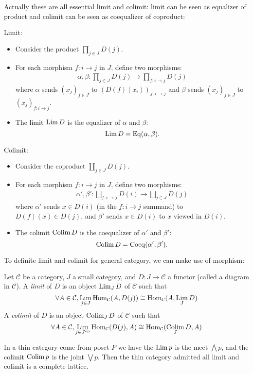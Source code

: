 \begin{remark}
  Actually these are all essential limit and colimit: limit can be seen as equalizer of product and colimit can be seen as coequalizer of coproduct:

  Limit:
\begin{itemize}
    \item Consider the product $\prod_{j \in J} D(j)$.
    \item For each morphism $f : i \to j$ in $J$, define two morphisms:
    \begin{align*}
        \alpha, \beta : \prod_{j \in J} D(j) \to \prod_{f : i \to j} D(j)
    \end{align*}
    where $\alpha$ sends $(x_j)_{j \in J}$ to $(D(f)(x_i))_{f : i \to j}$ and $\beta$ sends $(x_j)_{j \in J}$ to $(x_j)_{f : i \to j}$.
    \item The limit $\operatorname*{\mathrm{Lim}} D$ is the equalizer of $\alpha$ and $\beta$:
    \[
    \operatorname*{\mathrm{Lim}} D = \mathrm{Eq}(\alpha, \beta).
    \]
\end{itemize}
Colimit:
\begin{itemize}
    \item Consider the coproduct $\coprod_{j \in J} D(j)$.
    \item For each morphism $f : i \to j$ in $J$, define two morphisms:
    \begin{align*}
        \alpha', \beta' : \bigsqcup_{f : i \to j} D(i) \to \bigsqcup_{j \in J} D(j)
    \end{align*}
    where $\alpha'$ sends $x \in D(i)$ (in the $f : i \to j$ summand) to $D(f)(x) \in D(j)$, and $\beta'$ sends $x \in D(i)$ to $x$ viewed in $D(i)$.
    \item The colimit $\operatorname*{\mathrm{Colim}} D$ is the coequalizer of $\alpha'$ and $\beta'$:
    \[
    \operatorname*{\mathrm{Colim}} D = \mathrm{Coeq}(\alpha', \beta').
    \]
\end{itemize}
\end{remark}

\begin{remark}
  
\end{remark}

To definite limit and colimit for general category, we can make use of morphism:
\begin{definition}
  Let $\mathcal{C}$ be a category, $J$ a small category, and $D : J \to \mathcal{C}$ a functor (called a diagram in $\mathcal{C}$). A \emph{limit} of $D$ is an object $\operatorname*{\mathrm{Lim}}_J D$ of $\mathcal{C}$ such that 
\[
  \forall A\in \mathcal{C}, \operatorname*{\mathrm{Lim}}_{j\in J} \mathrm{Hom}_{\mathcal{C}}(A, D(j) ) \cong \mathrm{Hom}_{\mathcal{C}}(A, \operatorname*{\mathrm{Lim}}_{J} D)
\]
A \emph{colimit} of $D$ is an object $\operatorname*{\mathrm{Colim}}_J D$ of $\mathcal{C}$ such that
\[
  \forall A\in \mathcal{C}, \operatorname*{\mathrm{Lim}}_{j\in J^{\mathrm{op}}} \mathrm{Hom}_{\mathcal{C}}(D(j) , A) \cong \mathrm{Hom}_{\mathcal{C}}(\operatorname*{\mathrm{Colim}}_{ J} D, A)
\]
\end{definition}
\begin{example}
 In a thin category come from poset $P$ we have the $\operatorname*{\mathrm{Lim}} p $ is the meet $\bigwedge p$, and the colimit $\operatorname*{\mathrm{Colim}} p$ is the joint $ \bigvee p$. Then the thin category admitted all limit and colimit is a complete lattice.
\end{example}

